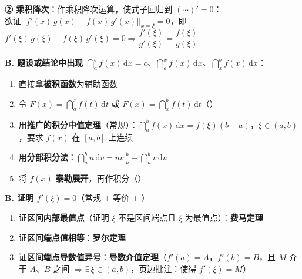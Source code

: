 \documentclass[a4paper,12pt]{article}
\begin{document}
    \begin{minipage}[t]{0.46\textwidth}
        \textbf{② 乘积降次}：作乘积降次运算，使式子回归到 $(\cdots)' = 0$：\\
        欲证 $\bigl[f'(x)\,g(x) - f(x)\,g'(x)\bigr]\bigr|_{x = \xi} = 0$，即 $f'(\xi)\,g(\xi) - f(\xi)\,g'(\xi) = 0 \Rightarrow \dfrac{f'(\xi)}{g'(\xi)} = \dfrac{f(\xi)}{g(\xi)}$

        \vspace{1.5em}

        \textbf{B. 题设或结论中出现} $\dint_{a}^{b} f(x)\,\mathrm{d}x = c$、$\dint_{a}^{x} f(x)\,\mathrm{d}x$、$\dint_{x}^{b} f(x)\,\mathrm{d}x$：
        \begin{enumerate}[label=(\arabic*), leftmargin=2em, itemsep=0.8em]
            \item 直接拿\textbf{被积函数}为辅助函数
            \item 令 $F(x) = \dint_{a}^{x} f(t)\,\mathrm{d}t$ 或 $F(x) = \dint_{x}^{b} f(t)\,\mathrm{d}t$（{\color{red}{经典}}）
            \item 用\textbf{推广的积分中值定理}（常规）：$\dint_{a}^{b} f(x)\,\mathrm{d}x = f(\xi)(b - a)$，$\xi \in (a, b)$，要求 $f(x)$ 在 $[a, b]$ 上连续
            \item 用\textbf{分部积分法}：$\dint_{a}^{b} u\,\mathrm{d}v = uv\big|_{a}^{b} - \dint_{a}^{b} v\,\mathrm{d}u$
            \item 将 $f(x)$ \textbf{泰勒展开}，再作积分（{\color{red}{经典}}）
        \end{enumerate}

        \vspace{1em}

        \textbf{B. 证明 $f'(\xi) = 0$}（常规 + 等价 + {\color{red}{经典}}）
        \begin{enumerate}[label=(\arabic*), leftmargin=2em, itemsep=0.8em]
            \item 证\textbf{区间内部最值点}（证明 $\xi$ 不是区间端点且 $\xi$ 为最值点）：\textbf{费马定理}
            \item 证\textbf{区间端点值相等}：\textbf{罗尔定理}
            \item 证\textbf{区间端点导数值异号}：\textbf{导数介值定理}（$f'(a) = A$，$f'(b) = B$，且 $M$ 介于 $A$、$B$ 之间 $\Rightarrow \exists\,\xi \in (a, b)$，页边批注：使得 $f'(\xi) = M$）
        \end{enumerate}
    \end{minipage}
    \hfill
\end{document}
